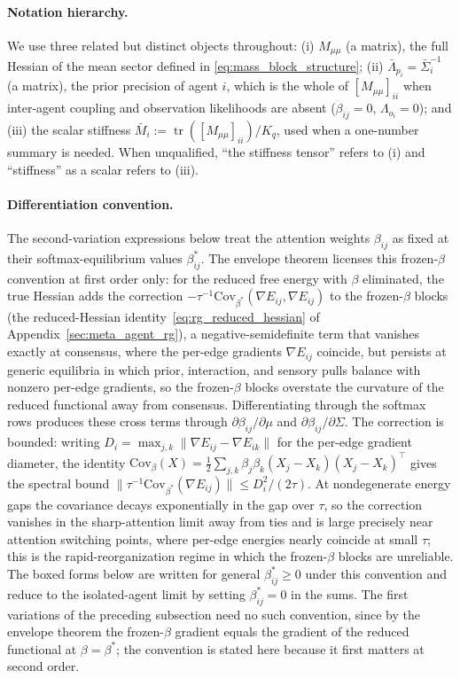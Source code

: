 \paragraph{Notation hierarchy.}
We use three related but distinct objects throughout: (i) $M_{\mu\mu}$ (a matrix), the full Hessian of the mean sector defined in \eqref{eq:mass_block_structure}; (ii) $\bar{\Lambda}_{p_i} = \bar{\Sigma}_i^{-1}$ (a matrix), the prior precision of agent $i$, which is the whole of $[M_{\mu\mu}]_{ii}$ when inter-agent coupling and observation likelihoods are absent ($\beta_{ij}=0$, $\Lambda_{o_i}=0$); and (iii) the scalar stiffness $\bar{M}_i := \operatorname{tr}([M_{\mu\mu}]_{ii})/K_q$, used when a one-number summary is needed. When unqualified, ``the stiffness tensor'' refers to (i) and ``stiffness'' as a scalar refers to (iii).

\paragraph{Differentiation convention.}
The second-variation expressions below treat the attention weights $\beta_{ij}$ as fixed at their softmax-equilibrium values $\beta_{ij}^*$. The envelope theorem licenses this frozen-$\beta$ convention at first order only: for the reduced free energy with $\beta$ eliminated, the true Hessian adds the correction $-\tau^{-1}\mathrm{Cov}_{\beta^*}(\nabla E_{ij}, \nabla E_{ij})$ to the frozen-$\beta$ blocks (the reduced-Hessian identity~\eqref{eq:rg_reduced_hessian} of Appendix~\ref{sec:meta_agent_rg}), a negative-semidefinite term that vanishes exactly at consensus, where the per-edge gradients $\nabla E_{ij}$ coincide, but persists at generic equilibria in which prior, interaction, and sensory pulls balance with nonzero per-edge gradients, so the frozen-$\beta$ blocks overstate the curvature of the reduced functional away from consensus. Differentiating through the softmax rows produces these cross terms through $\partial \beta_{ij}/\partial \mu$ and $\partial \beta_{ij}/\partial \Sigma$. The correction is bounded: writing $D_i = \max_{j,k}\|\nabla E_{ij} - \nabla E_{ik}\|$ for the per-edge gradient diameter, the identity $\mathrm{Cov}_\beta(X) = \tfrac{1}{2}\sum_{j,k}\beta_j\beta_k(X_j - X_k)(X_j - X_k)^\top$ gives the spectral bound $\|\tau^{-1}\mathrm{Cov}_{\beta^*}(\nabla E_{ij})\| \le D_i^2/(2\tau)$. At nondegenerate energy gaps the covariance decays exponentially in the gap over $\tau$, so the correction vanishes in the sharp-attention limit away from ties and is large precisely near attention switching points, where per-edge energies nearly coincide at small $\tau$; this is the rapid-reorganization regime in which the frozen-$\beta$ blocks are unreliable. The boxed forms below are written for general $\beta_{ij}^* \geq 0$ under this convention and reduce to the isolated-agent limit by setting $\beta_{ij}^* = 0$ in the sums. The first variations of the preceding subsection need no such convention, since by the envelope theorem the frozen-$\beta$ gradient equals the gradient of the reduced functional at $\beta = \beta^*$; the convention is stated here because it first matters at second order.

